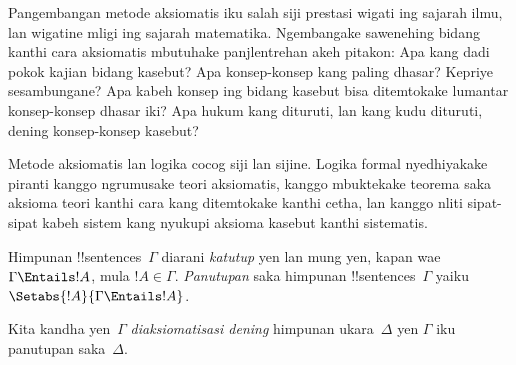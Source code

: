 \documentclass[../../../include/open-logic-section]{subfiles}
\begin{document}

\begin{explain}
Pangembangan metode aksiomatis iku salah siji prestasi
wigati ing sajarah ilmu, lan wigatine mligi ing sajarah
matematika. Ngembangake sawenehing bidang kanthi cara
aksiomatis mbutuhake panjlentrehan akeh pitakon: Apa
kang dadi pokok kajian bidang kasebut? Apa konsep-konsep
kang paling dhasar? Kepriye sesambungane? Apa kabeh
konsep ing bidang kasebut bisa ditemtokake lumantar
konsep-konsep dhasar iki? Apa hukum kang dituruti,
lan kang kudu dituruti, dening konsep-konsep kasebut?

Metode aksiomatis lan logika cocog siji lan sijine.
Logika formal nyedhiyakake piranti kanggo ngrumusake
teori aksiomatis, kanggo mbuktekake teorema saka aksioma
teori kanthi cara kang ditemtokake kanthi cetha,
lan kanggo nliti sipat-sipat kabeh sistem kang nyukupi
aksioma kasebut kanthi sistematis.
\end{explain}

\begin{defn}
Himpunan !!{sentence}s~$\Gamma$ diarani \emph{katutup}
yen lan mung yen, kapan wae $\Gamma \Entails !A$,
mula $!A \in \Gamma$. \emph{Panutupan} saka himpunan
!!{sentence}s~$\Gamma$ yaiku
$\Setabs{!A}{\Gamma \Entails !A}$.

Kita kandha yen~$\Gamma$ \emph{diaksiomatisasi dening}
himpunan ukara~$\Delta$ yen $\Gamma$ iku panutupan
saka~$\Delta$.
\end{defn}
\end{document}
